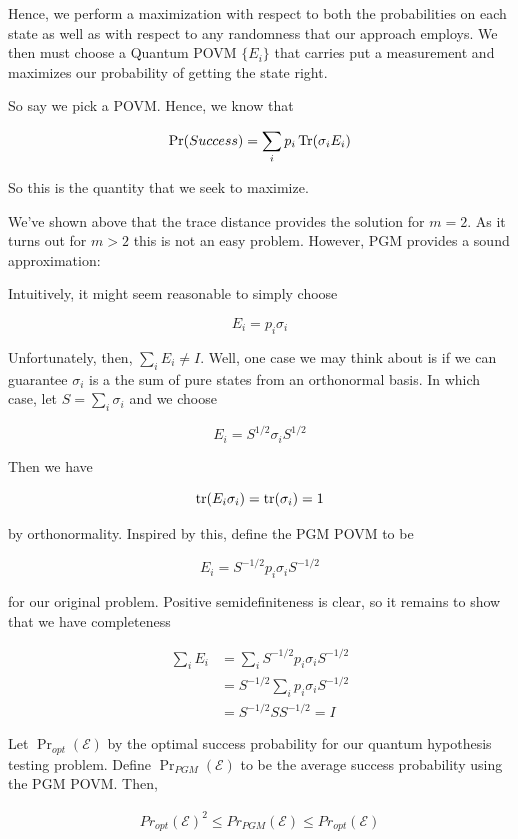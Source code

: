 \documentclass[main.tex]{subfiles}
\begin{document}
Hence, we perform a maximization with respect to both the probabilities on each state as well as with respect to any randomness that our approach employs. We then must choose a Quantum POVM $\{E_i\}$ that carries put a measurement and maximizes our probability of getting the state right.

So say we pick a POVM. Hence, we know that

\begin{align*}
\Pr(Success)= \sum_i p_i \Tr (\sigma_i E_i)
\end{align*}


So this is the quantity that we seek to maximize.

We've shown above that the trace distance provides the solution for $m=2$. As it turns out for $m>2$ this is not an easy problem. However, PGM provides a sound approximation:

Intuitively, it might seem reasonable to simply choose

$$E_i = p_i \sigma_i$$

Unfortunately, then, $\sum_i E_i \neq I$. Well, one case we may think about is if we can guarantee $\sigma_i$ is a the sum of pure states from an orthonormal basis. In which case, let $S = \sum_i \sigma_i$ and we choose

$$E_i = S^{1/2} \sigma_i S^{1/2} $$

Then we have

$$
\tr(E_i \sigma_i) = \tr(\sigma_i) = 1
$$

by orthonormality. Inspired by this, define the PGM POVM to be

$$E_i = S^{-1/2}p_i \sigma_i S^{-1/2}$$

for our original problem. Positive semidefiniteness is clear, so it remains to show that we have completeness

\begin{align*}
\sum_i E_i &= \sum_i S^{-1/2}p_i \sigma_i S^{-1/2}\\
&=  S^{-1/2} \sum_i p_i \sigma_i S^{-1/2} \\
&= S^{-1/2} S S^{-1/2} = I
\end{align*}

\begin{theorem}
Let $\Pr_{opt}(\mathcal{E})$ by the optimal success probability for our 	quantum hypothesis testing problem. Define $\Pr_{PGM}(\mathcal{E})$ to be the average success probability using the PGM POVM. Then,

\begin{align*}
Pr_{opt}(\mathcal{E})^2 \leq Pr_{PGM}(\mathcal{E}) \leq 	Pr_{opt}(\mathcal{E})
\end{align*}

\end{theorem}
\end{document}
